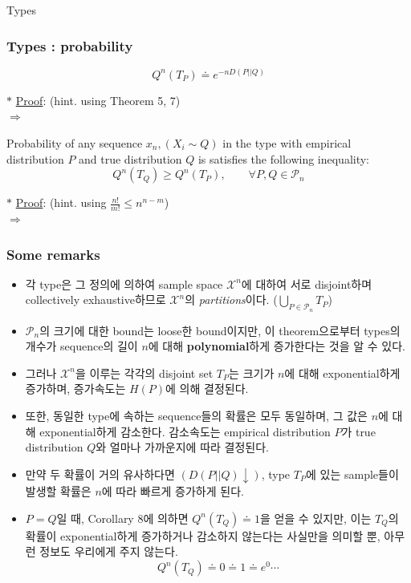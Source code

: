 \documentclass[9pt]{beamer}
\begin{document}
\begin{section}{Types}
        \begin{frame}
            \frametitle{Types : probability}
            \begin{corollary}
                $$Q^n(T_P) \doteq e^{-nD(P||Q)}$$
            \end{corollary}
            \vspace{0.2cm}
            $\ast$ \underline{Proof}: (hint. using Theorem 5, 7)
            \\$\Rightarrow$
            \vspace{1cm}
            \begin{lemma}
                Probability of any sequence $x_n, (X_i \sim Q)$ in the type with empirical distribution $P$ and true distribution $Q$ is satisfies the following inequality:
                $$Q^n(T_Q) \ge Q^n (T_P),\qquad \forall P, Q \in \mathcal P_n$$ 
            \end{lemma}
            $\ast$ \underline{Proof}: (hint. using $\frac{n!}{m!} \leq n^{n-m} $)
            \\$\Rightarrow$
            \vspace{1cm}
        \end{frame}

        \begin{frame}
            \frametitle{Some remarks}
            \begin{itemize}
                \item 각 type은 그 정의에 의하여 sample space $\mathcal X^n$에 대하여 서로 disjoint하며 collectively exhaustive하므로 $\mathcal X^n$의 \textit{partitions}이다.
                ($ \bigcup_{P \in \mathcal P_n} T_P $)
                \item $\mathcal P_n$의 크기에 대한 bound는 loose한 bound이지만, 이 theorem으로부터 types의 개수가 sequence의 길이 $n$에 대해 \textbf{polynomial}하게 증가한다는 것을 알 수 있다. 
                \item 그러나 $\mathcal X^n$을 이루는 각각의 disjoint set $T_P$는 크기가 $n$에 대해 exponential하게 증가하며, 증가속도는 $H(P)$에 의해 결정된다.
                \item 또한, 동일한 type에 속하는 sequence들의 확률은 모두 동일하며, 그 값은 $n$에 대해 exponential하게 감소한다. 감소속도는 empirical distribution $P$가 true distribution $Q$와 얼마나 가까운지에 따라 결정된다.
                \item 만약 두 확률이 거의 유사하다면 $(D(P||Q) \downarrow)$, type $T_P$에 있는 sample들이 발생할 확률은 $n$에 따라 빠르게 증가하게 된다.
                \item $P=Q$일 때, Corollary 8에 의하면 $Q^n (T_Q) \doteq 1$을 얻을 수 있지만, 이는 $T_Q$의 확률이 exponential하게 증가하거나 감소하지 않는다는 사실만을 의미할 뿐, 아무런 정보도 우리에게 주지 않는다. 
                $$ Q^n(T_Q) \doteq 0 \doteq 1 \doteq e^0 \cdots$$
            \end{itemize}
            \vspace{-0.5cm}
        \end{frame}


\end{section}
\end{document}
